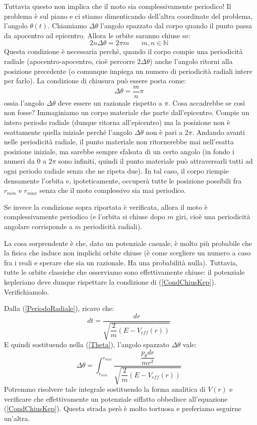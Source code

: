\documentclass[a4paper,openany]{article}
\begin{document}
	Tuttavia questo non implica che il moto sia complessivamente periodico! Il problema è sul piano e ci stiamo dimenticando dell'altra coordinate del problema, l'angolo $\theta(t)$. Chiamiamo $\Delta \theta$ l'angolo spazzato dal corpo quando il punto passa da apocentro ad epicentro. Allora le orbite saranno chiuse se:
	$$
	2n\Delta\theta = 2\pi m \>\>\>\>\>\>\>\> m,n \in \mathbb{N}
	$$
	Questa condizione è necessaria perché, quando il corpo compie una periodicità radiale (apocentro-apocentro, cioè percorre $2\Delta\theta$) anche l'angolo ritorni alla posizione precedente (o comunque impiega un numero di periodicità radiali intere per farlo). La condizione di chiusura può essere posta come:
	\begin{equation}
		\Delta\theta = \dfrac{m}{n}\pi
		\label{CondChiusKep}
	\end{equation}
	ossia l'angolo $\Delta\theta$ deve essere un razionale rispetto a $\pi$. Cosa accadrebbe se così non fosse? Immaginiamo un corpo materiale che parte dall'epicentro. Compie un intero periodo radiale (dunque ritorna all'epicentro) ma la posizione non è esattamente quella iniziale perché l'angolo $\Delta\theta$ non è pari a $2\pi$. Andando avanti nelle periodicità radiale, il punto materiale non ritornerebbe mai nell'esatta posizione iniziale, ma sarebbe sempre sfalsata di un certo angolo (in fondo i numeri da $0$ a $2\pi$ sono infiniti, quindi il punto materiale può attraversarli tutti ad ogni periodo radiale senza che ne ripeta due). In tal caso, il corpo riempie densamente l'orbita e, ipoteticamente, occuperà tutte le posizione possibili fra $r_{min}$ e $r_{max}$ senza che il moto complessivo sia mai periodico. 
	
	Se invece la condizione sopra riportata è verificata, allora il moto è complessivamente periodico (e l'orbita si chiuse dopo $m$ giri, cioè una periodicità angolare corrisponde a $m$ periodicità radiali).  
	
	\medskip
	
	La cosa sorprendente è che, dato un potenziale casuale, è molto più probabile che la fisica che induce non implichi orbite chiuse (è come scegliere un numero a caso fra i reali e sperare che sia un razionale. Ha una probabilità nulla). Tuttavia, tutte le orbite classiche che osserviamo sono effettivamente chiuse: il potenziale kepleriano deve dunque rispettare la condizione di (\ref{CondChiusKep}). Verifichiamolo.
	
	Dalla (\ref{PeriodoRadiale}), ricavo che:
	$$
	dt = \dfrac{dr}{\sqrt{\dfrac{2}{m}(E-V_{eff}(r))}}
	$$
	E quindi sostituendo nella (\ref{Theta}), l'angolo spazzato $\Delta\theta$ vale:
	\begin{equation}
		\Delta\theta = \int_{r_{min}}^{r_{max}}\dfrac{\dfrac{p_{\theta}dr}{mr^{2}}}{\sqrt{\dfrac{2}{m}(E-V_{eff}(r))}}
	\end{equation}
	Potremmo risolvere tale integrale sostituendo la forma analitica di $V(r)$ e verificare che effettivamente un potenziale siffatto obbedisce all'equazione (\ref{CondChiusKep}). Questa strada però è molto tortuosa e preferiamo seguirne un'altra. 
	
\end{document}
